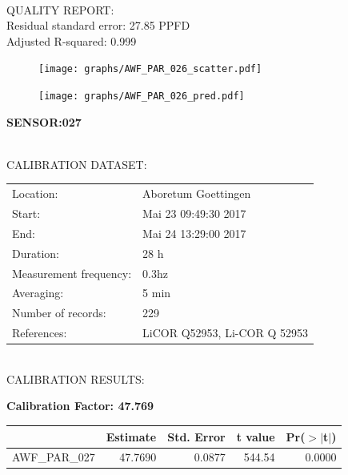 \documentclass[oneside]{report}
\begin{document}
\hrulefill\\
QUALITY REPORT:\\
Residual standard error: 27.85 PPFD\\
Adjusted R-squared: 0.999



\begin{figure}[H]
  \centering
  \texttt{[image: graphs/AWF\_PAR\_026\_scatter.pdf]}
\end{figure}




\begin{figure}[H]
  \centering
  \texttt{[image: graphs/AWF\_PAR\_026\_pred.pdf]}
\end{figure}

\pagebreak


\begin{center}
\large{\textbf{SENSOR:027}}\\
\end{center}

\hrulefill\\
CALIBRATION DATASET:\\
\begin{table}[h!]
  \centering
  \label{tab:table1}
  \begin{tabular}{ll}
    Location: & Aboretum Goettingen\\ 
    
    
    Start:  & Mai 23 09:49:30 2017 \\
    End:   & Mai 24 13:29:00 2017\\ 
    Duration: & 28 h\\
    Measurement frequency: & 0.3hz\\
    Averaging:  &5 min\\
    Number of records: & 229 \\
    References: & LiCOR Q52953, Li-COR Q 52953 \\
  \end{tabular}
\end{table}

\hrulefill\\
CALIBRATION RESULTS:\\


\begin{center}
\textbf{\large{Calibration Factor: 47.769}}\\
\end{center}
\begin{table}[ht]
\centering
\begin{tabular}{rrrrr}
  \hline
 & Estimate & Std. Error & t value & Pr($>$$|$t$|$) \\ 
  \hline
AWF\_PAR\_027 & 47.7690 & 0.0877 & 544.54 & 0.0000 \\ 
   \hline
\end{tabular}
\end{table}
\end{document}

